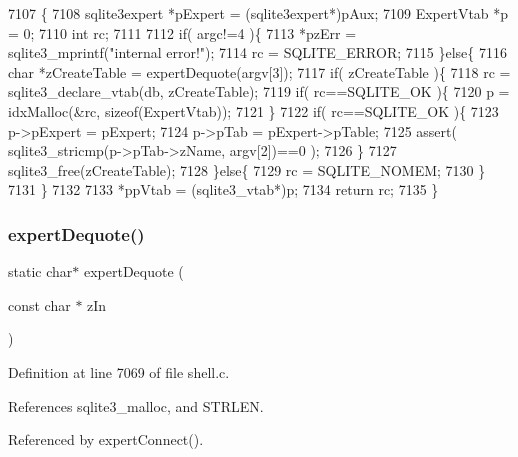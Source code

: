 \begin{DoxyCode}
7107  \{
7108   sqlite3expert *pExpert = (sqlite3expert*)pAux;
7109   ExpertVtab *p = 0;
7110   \textcolor{keywordtype}{int} rc;
7111 
7112   \textcolor{keywordflow}{if}( argc!=4 )\{
7113     *pzErr = sqlite3_mprintf(\textcolor{stringliteral}{"internal error!"});
7114     rc = SQLITE_ERROR;
7115   \}\textcolor{keywordflow}{else}\{
7116     \textcolor{keywordtype}{char} *zCreateTable = expertDequote(argv[3]);
7117     \textcolor{keywordflow}{if}( zCreateTable )\{
7118       rc = sqlite3_declare_vtab(db, zCreateTable);
7119       \textcolor{keywordflow}{if}( rc==SQLITE_OK )\{
7120         p = idxMalloc(&rc, \textcolor{keyword}{sizeof}(ExpertVtab));
7121       \}
7122       \textcolor{keywordflow}{if}( rc==SQLITE_OK )\{
7123         p->pExpert = pExpert;
7124         p->pTab = pExpert->pTable;
7125         assert( sqlite3_stricmp(p->pTab->zName, argv[2])==0 );
7126       \}
7127       sqlite3_free(zCreateTable);
7128     \}\textcolor{keywordflow}{else}\{
7129       rc = SQLITE_NOMEM;
7130     \}
7131   \}
7132 
7133   *ppVtab = (sqlite3_vtab*)p;
7134   \textcolor{keywordflow}{return} rc;
7135 \}
\end{DoxyCode}
\mbox{\label{shell_8c_aa3223104fda8d1491832d6e08fea83a9}} 
\subsubsection{expert\+Dequote()}
{\footnotesize\ttfamily static char$\ast$ expert\+Dequote (\begin{DoxyParamCaption}\item[{const char $\ast$}]{z\+In }\end{DoxyParamCaption})\hspace{0.3cm}{\ttfamily [static]}}



Definition at line 7069 of file shell.\+c.



References sqlite3\+\_\+malloc, and S\+T\+R\+L\+EN.



Referenced by expert\+Connect().


